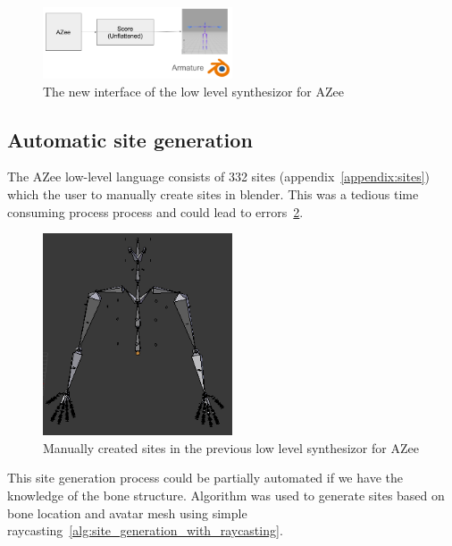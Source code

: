 \documentclass[../../main.tex]{subfiles}
\begin{document}
\begin{figure}
    \centering
    \includegraphics[width=0.5\textwidth]{chapters/rigging_layers/images/new_interface.png}
    \caption{The new interface of the low level synthesizor for AZee}
    \label{fig:new_interface}
\end{figure}

\subsection{Automatic site generation}
\label{ch:rigging_layers:proc_rig_signing_avatars:auto_site_generation}

The AZee low-level language consists of 332 sites (appendix~\ref{appendix:sites}) which the user to manually create sites in blender. This was a tedious time consuming process process and could lead to errors~\ref{fig:prev_sites}.

\begin{figure}
    \centering
    \includegraphics[width=0.5\textwidth]{chapters/rigging_layers/images/prev_sites.png}
    \caption{Manually created sites in the previous low level synthesizor for AZee}
    \label{fig:prev_sites}
\end{figure}

This site generation process could be partially automated if we have the knowledge of the bone structure. Algorithm was used to generate sites based on bone location and avatar mesh using simple raycasting~\ref{alg:site_generation_with_raycasting}.
\end{document}

